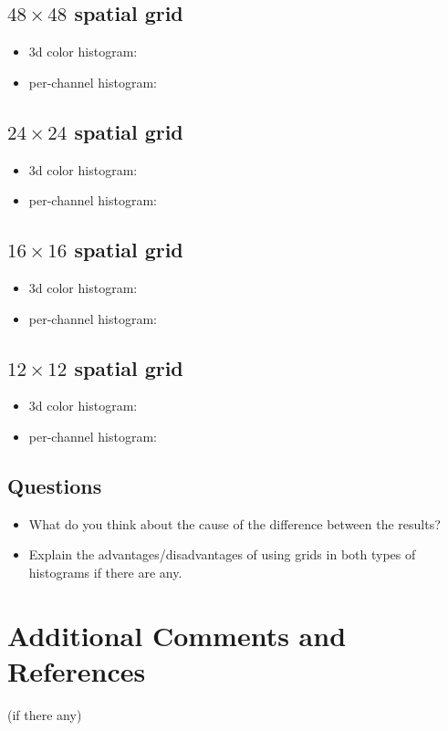 \documentclass[12pt]{article}
\begin{document}
\subsection{$48\times48$ spatial grid}
\begin{itemize}
\item 3d color histogram:
\item per-channel histogram:
\end{itemize}

\subsection{$24\times24$ spatial grid}
\begin{itemize}
\item 3d color histogram:
\item per-channel histogram:
\end{itemize}

\subsection{$16\times16$ spatial grid}
\begin{itemize}
\item 3d color histogram:
\item per-channel histogram:
\end{itemize}

\subsection{$12\times12$ spatial grid}
\begin{itemize}
\item 3d color histogram:
\item per-channel histogram:
\end{itemize}

\subsection{Questions}
\begin{itemize}
\item What do you think about the cause of the difference between the results?
\item Explain the advantages/disadvantages of using grids in both types of histograms if there are any.
\end{itemize}


\section{Additional Comments and References}

(if there any)
\end{document}
